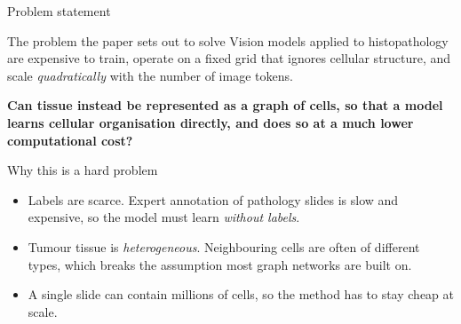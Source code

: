 \documentclass[aspectratio=169,11pt]{beamer}
\begin{document}
\begin{frame}{Problem statement}

  \begin{alertblock}{The problem the paper sets out to solve}
    Vision models applied to histopathology are expensive to train, operate on a
    fixed grid that ignores cellular structure, and scale \emph{quadratically}
    with the number of image tokens.

    \vspace{0.4em}
    \textbf{Can tissue instead be represented as a graph of cells, so that a
    model learns cellular organisation directly, and does so at a much lower
    computational cost?}
  \end{alertblock}

  \vspace{0.6em}
  \begin{block}{Why this is a hard problem}
    \begin{itemize}\small
      \item Labels are scarce. Expert annotation of pathology slides is slow and
            expensive, so the model must learn \emph{without labels}.
      \item Tumour tissue is \emph{heterogeneous}. Neighbouring cells are often
            of different types, which breaks the assumption most graph networks
            are built on.
      \item A single slide can contain millions of cells, so the method has to
            stay cheap at scale.
    \end{itemize}
  \end{block}

\end{frame}
\end{document}
